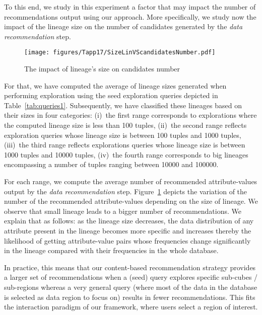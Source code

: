 To this end, we study in this experiment a factor that may impact the number of recommendations output using our approach.
More specifically, we study now the impact of the lineage size on the number of candidates generated by the \emph{data recommendation} step.
  \begin{figure}[t]
\centering
\texttt{[image: figures/Tapp17/SizeLinVScandidatesNumber.pdf]}
\caption{The impact of lineage's size on candidates number}
\label{fig:lineageImpact}
\end{figure}

For that, we have computed the average of lineage sizes generated when performing exploration using the seed exploration queries depicted in Table~\ref{tab:queries1}. Subsequently, we have classified these lineages based on their sizes in four categories: (i)~the first range corresponds to explorations where the computed lineage size is less than 100 tuples, (ii)~the second range reflects exploration queries whose lineage size is between 100 tuples and 1000 tuples, (iii)~the third range reflects explorations queries whose lineage size is between 1000 tuples and 10000 tuples, (iv)~the fourth range corresponds to big lineages encompassing a number of tuples ranging between 10000 and 100000.



For each range, we compute the average number of recommended attribute-values output by the \emph{data recommendation} step. Figure~\ref{fig:lineageImpact} depicts the variation of the number of the recommended attribute-values depending on the size of lineage. We observe that small lineage leads to a bigger number of recommendations. 
We explain that as follows: as the lineage size decreases, the data distribution of any attribute present in the lineage becomes more specific and increases thereby the likelihood of getting attribute-value pairs whose frequencies change significantly in the lineage compared with their frequencies in the whole database.

In practice, this means that our content-based recommendation strategy provides a larger set of recommendations when a (seed) query explores specific sub-cubes / sub-regions whereas a very general query (where most of the data in the database is selected as data region to focus on) results in fewer recommendations. This fits the interaction paradigm of our framework, where users select a region of interest.





